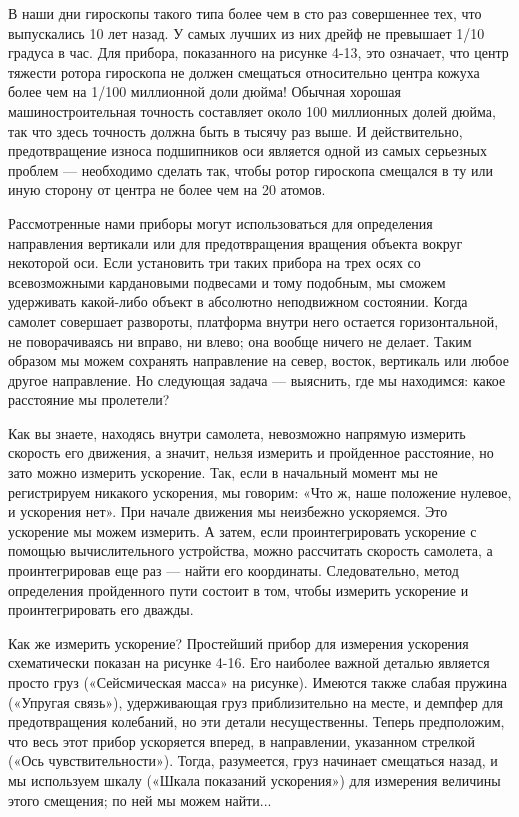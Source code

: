 \documentclass[10pt,oneside]{article}
\newcommand{\TipsSubsection}[1]{\par\vspace{6bp}{\normalsize\bfseries #1\par}\vspace{2bp}}
\begin{document}
В наши дни гироскопы такого типа более чем в сто раз совершеннее тех, что выпускались 10 лет назад. У самых лучших из них дрейф не превышает 1/10 градуса в час. Для прибора, показанного на рисунке 4-13, это означает, что центр тяжести ротора гироскопа не должен смещаться относительно центра кожуха более чем на 1/100 миллионной доли дюйма! Обычная хорошая машиностроительная точность составляет около 100 миллионных долей дюйма, так что здесь точность должна быть в тысячу раз выше. И действительно, предотвращение износа подшипников оси является одной из самых серьезных проблем --- необходимо сделать так, чтобы ротор гироскопа смещался в ту или иную сторону от центра не более чем на 20 атомов.\par

\TipsSubsection{4-7 Акселерометры}

Рассмотренные нами приборы могут использоваться для определения направления вертикали или для предотвращения вращения объекта вокруг некоторой оси. Если установить три таких прибора на трех осях со всевозможными кардановыми подвесами и тому подобным, мы сможем удерживать какой-либо объект в абсолютно неподвижном состоянии. Когда самолет совершает развороты, платформа внутри него остается горизонтальной, не поворачиваясь ни вправо, ни влево; она вообще ничего не делает. Таким образом мы можем сохранять направление на север, восток, вертикаль или любое другое направление. Но следующая задача --- выяснить, где мы находимся: какое расстояние мы пролетели?\par

Как вы знаете, находясь внутри самолета, невозможно напрямую измерить скорость его движения, а значит, нельзя измерить и пройденное расстояние, но зато можно измерить ускорение. Так, если в начальный момент мы не регистрируем никакого ускорения, мы говорим: «Что ж, наше положение нулевое, и ускорения нет». При начале движения мы неизбежно ускоряемся. Это ускорение мы можем измерить. А затем, если проинтегрировать ускорение с помощью вычислительного устройства, можно рассчитать скорость самолета, а проинтегрировав еще раз --- найти его координаты. Следовательно, метод определения пройденного пути состоит в том, чтобы измерить ускорение и проинтегрировать его дважды.\par

Как же измерить ускорение? Простейший прибор для измерения ускорения схематически показан на рисунке 4-16. Его наиболее важной деталью является просто груз («Сейсмическая масса» на рисунке). Имеются также слабая пружина («Упругая связь»), удерживающая груз приблизительно на месте, и демпфер для предотвращения колебаний, но эти детали несущественны. Теперь предположим, что весь этот прибор ускоряется вперед, в направлении, указанном стрелкой («Ось чувствительности»). Тогда, разумеется, груз начинает смещаться назад, и мы используем шкалу («Шкала показаний ускорения») для измерения величины этого смещения; по ней мы можем найти...\par
\end{document}

